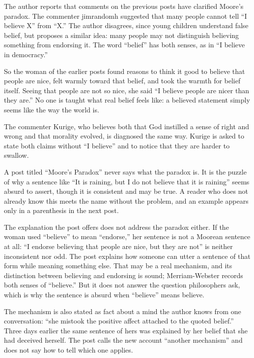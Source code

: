 \begin{afterword}
\summaryhead

The author reports that comments on the previous posts have clarified Moore's paradox. The commenter jimrandomh suggested that many people cannot tell ``I believe X'' from ``X.'' The author disagrees, since young children understand false belief, but proposes a similar idea: many people may not distinguish believing something from endorsing it. The word ``belief'' has both senses, as in ``I believe in democracy.''

So the woman of the earlier posts found reasons to think it good to believe that people are nice, felt warmly toward that belief, and took the warmth for belief itself. Seeing that people are not so nice, she said ``I believe people are nicer than they are.'' No one is taught what real belief feels like: a believed statement simply seems like the way the world is.

The commenter Kurige, who believes both that God instilled a sense of right and wrong and that morality evolved, is diagnosed the same way. Kurige is asked to state both claims without ``I believe'' and to notice that they are harder to swallow.

\responsehead

A post titled ``Moore's Paradox'' never says what the paradox is. It is the puzzle of why a sentence like ``It is raining, but I do not believe that it is raining'' seems absurd to assert, though it is consistent and may be true. A reader who does not already know this meets the name without the problem, and an example appears only in a parenthesis in the next post.

The explanation the post offers does not address the paradox either. If the woman used ``believe'' to mean ``endorse,'' her sentence is not a Moorean sentence at all: ``I endorse believing that people are nice, but they are not'' is neither inconsistent nor odd. The post explains how someone can utter a sentence of that form while meaning something else. That may be a real mechanism, and its distinction between believing and endorsing is sound; Merriam-Webster records both senses of ``believe.'' But it does not answer the question philosophers ask, which is why the sentence is absurd when ``believe'' means believe.

The mechanism is also stated as fact about a mind the author knows from one conversation: ``she mistook the positive affect attached to the quoted belief.'' Three days earlier the same sentence of hers was explained by her belief that she had deceived herself. The post calls the new account ``another mechanism'' and does not say how to tell which one applies.


\end{afterword}
